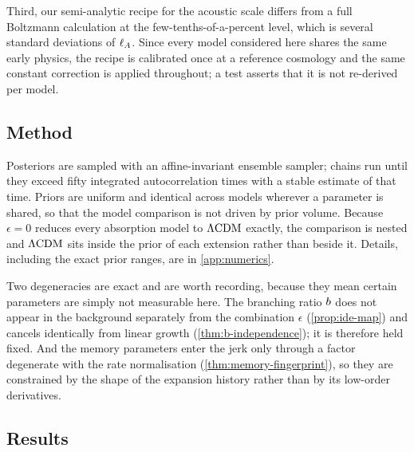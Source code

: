 Third, our semi-analytic recipe for the acoustic scale differs from a full
Boltzmann calculation at the few-tenths-of-a-percent level, which is several
standard deviations of $\ell_{A}$. Since every model considered here shares the same
early physics, the recipe is calibrated once at a reference cosmology and the
same constant correction is applied throughout; a test asserts that it is not
re-derived per model.

\subsection{Method}\label{sec:observations-method}

Posteriors are sampled with an affine-invariant ensemble sampler; chains run
until they exceed fifty integrated autocorrelation times with a stable estimate
of that time. Priors are uniform and identical across models wherever a
parameter is shared, so that the model comparison is not driven by prior
volume. Because $\epsilon=0$ reduces every absorption model to $\Lambda\mathrm{CDM}$ exactly,
the comparison is nested and $\Lambda\mathrm{CDM}$ sits inside the prior of each extension
rather than beside it. Details, including the exact prior ranges, are in
\cref{app:numerics}.

Two degeneracies are exact and are worth recording, because they mean certain
parameters are simply not measurable here. The branching ratio $b$ does
not appear in the background separately from the combination $\epsilon$
(\cref{prop:ide-map}) and cancels identically from linear growth
(\cref{thm:b-independence}); it is therefore held fixed. And the memory
parameters enter the jerk only through a factor degenerate with the rate
normalisation (\cref{thm:memory-fingerprint}), so they are constrained by the
shape of the expansion history rather than by its low-order derivatives.

\subsection{Results}\label{sec:observations-results}

